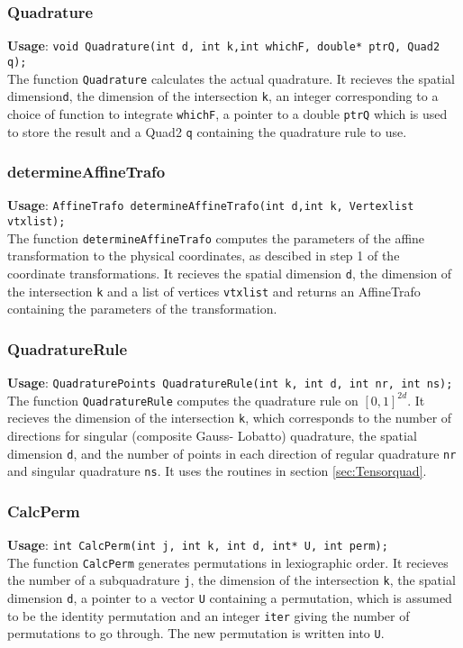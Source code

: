 \documentclass[a4paper,10pt]{article}
\begin{document}
\subsubsection{Quadrature}
\textbf{Usage}: \verb=void Quadrature(int d, int k,int whichF, double* ptrQ, Quad2 q);=\\
The function \verb=Quadrature= calculates the actual quadrature. It recieves the spatial dimension\verb=d=,
 the dimension of the intersection \verb=k=, an integer corresponding to a choice of function to integrate
\verb=whichF=, a pointer to a double \verb=ptrQ= which is used to store the result
 and a Quad2 \verb=q= containing the quadrature rule to use. 
\subsubsection{determineAffineTrafo}
\textbf{Usage}: \verb=AffineTrafo determineAffineTrafo(int d,int k, Vertexlist vtxlist);=\\
The function \verb=determineAffineTrafo= computes the parameters of the affine transformation to the
 physical coordinates, as descibed in step 1 of the coordinate transformations. It recieves the spatial
dimension \verb=d=, the dimension of the intersection \verb=k= and a list of vertices \verb=vtxlist= and returns
an AffineTrafo containing the parameters of the transformation.
\subsubsection{QuadratureRule}
\textbf{Usage}: \verb=QuadraturePoints QuadratureRule(int k, int d, int nr, int ns);=\\
The function \verb=QuadratureRule= computes the quadrature rule on $[0,1]^{2d}$. It recieves the dimension
of the intersection \verb=k=, which corresponds to the number of directions for singular (composite Gauss-
Lobatto) quadrature, the spatial dimension \verb=d=, and the number of points in each direction of regular
quadrature \verb=nr= and singular quadrature \verb=ns=. It uses the routines in section \ref{sec:Tensorquad}.
\subsubsection{CalcPerm}
\textbf{Usage}: \verb=int CalcPerm(int j, int k, int d, int* U, int perm);=\\
The function \verb=CalcPerm= generates permutations in lexiographic order. It recieves the number of a 
subquadrature \verb=j=, the dimension of the intersection \verb=k=, the spatial dimension \verb=d=, a pointer to
a vector \verb=U= containing a permutation, which is assumed to be the identity permutation and an integer 
\verb=iter= giving the number of permutations to go through. The new permutation is written into \verb=U=.
\end{document}
